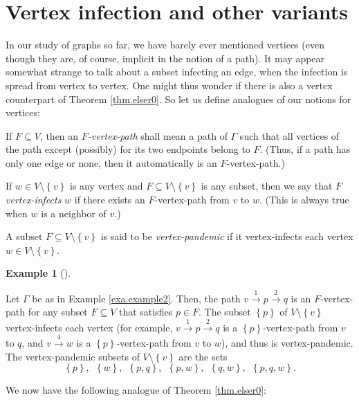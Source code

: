 \documentclass[numbers=enddot,12pt,final,onecolumn]{scrartcl}%
\theoremstyle{definition}
\newtheorem{exam}[theo]{Example}
\newenvironment{example}[1][]
{\begin{exam}[#1]\begin{leftbar}}
{\end{leftbar}\end{exam}}
\begin{document}
\section{Vertex infection and other variants}

In our study of graphs so far, we have barely ever mentioned vertices (even
though they are, of course, implicit in the notion of a path). It may appear
somewhat strange to talk about a subset infecting an edge, when the infection
is spread from vertex to vertex. One might thus wonder if there is also a
vertex counterpart of Theorem \ref{thm.elser0}. So let us define analogues of
our notions for vertices:

If $F\subseteq V$, then an $F$\emph{-vertex-path} shall mean a path of
$\Gamma$ such that all vertices of the path except (possibly) for its two
endpoints belong to $F$. (Thus, if a path has only one edge or none, then it
automatically is an $F$-vertex-path.)

If $w\in V\setminus\left\{  v\right\}  $ is any vertex and $F\subseteq
V\setminus\left\{  v\right\}  $ is any subset, then we say that $F$
\emph{vertex-infects }$w$ if there exists an $F$-vertex-path from $v$ to $w$.
(This is always true when $w$ is a neighbor of $v$.)

A subset $F\subseteq V\setminus\left\{  v\right\}  $ is said to be
\emph{vertex-pandemic} if it vertex-infects each vertex $w\in V\setminus
\left\{  v\right\}  $.

\begin{example}
Let $\Gamma$ be as in Example \ref{exa.example2}. Then, the path
$v\overset{1}{\longrightarrow}p\overset{2}{\longrightarrow}q$ is an
$F$-vertex-path for any subset $F\subseteq V$ that satisfies $p\in F$. The
subset $\left\{  p\right\}  $ of $V\setminus\left\{  v\right\}  $
vertex-infects each vertex (for example, $v\overset{1}{\longrightarrow
}p\overset{2}{\longrightarrow}q$ is a $\left\{  p\right\}  $-vertex-path from
$v$ to $q$, and $v\overset{4}{\longrightarrow}w$ is a $\left\{  p\right\}
$-vertex-path from $v$ to $w$), and thus is vertex-pandemic. The
vertex-pandemic subsets of $V\setminus\left\{  v\right\}  $ are the sets%
\[
\left\{  p\right\}  ,\ \ \left\{  w\right\}  ,\ \ \left\{  p,q\right\}
,\ \ \left\{  p,w\right\}  ,\ \ \left\{  q,w\right\}  ,\ \ \left\{
p,q,w\right\}  .
\]

\end{example}

We now have the following analogue of Theorem \ref{thm.elser0}:
\end{document}
